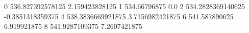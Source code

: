 0 536.827392578125 2.159423828125
1 534.66796875 0.0
2 534.2828369140625 -0.3851318359375
4 538.3836669921875 3.7156982421875
6 541.587890625 6.919921875
8 541.9287109375 7.2607421875
